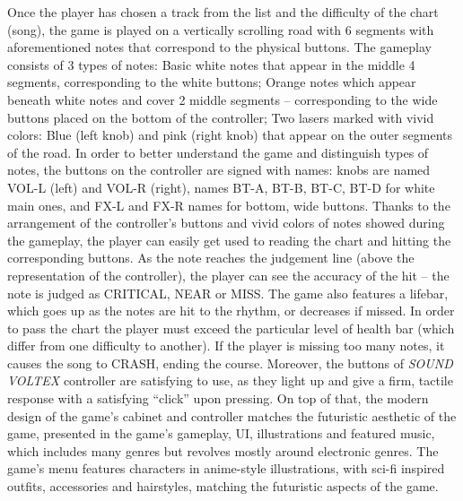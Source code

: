 Once the player has chosen a track from the list and the difficulty of the chart (song), the game is played on a vertically scrolling road with 6 segments with aforementioned notes that correspond to the physical buttons. The gameplay consists of 3 types of notes: Basic white notes that appear in the middle 4 segments, corresponding to the white buttons; Orange notes which appear beneath white notes and cover 2 middle segments -- corresponding to the wide buttons placed on the bottom of the controller; Two lasers marked with vivid colors: Blue (left knob) and pink (right knob) that appear on the outer segments of the road. In order to better understand the game and distinguish types of notes, the buttons on the controller are signed with names: knobs are named VOL-L (left) and VOL-R (right), names BT-A, BT-B, BT-C, BT-D for white main ones, and FX-L and FX-R names for bottom, wide buttons. Thanks to the arrangement of the controller’s buttons and vivid colors of notes showed during the gameplay, the player can easily get used to reading the chart and hitting the corresponding buttons. As the note reaches the judgement line (above the representation of the controller), the player can see the accuracy of the hit -- the note is judged as CRITICAL, NEAR or MISS. The game also features a lifebar, which goes up as the notes are hit to the rhythm, or decreases if missed. In order to pass the chart the player must exceed the particular level of health bar (which differ from one difficulty to another). If the player is missing too many notes, it causes the song to CRASH, ending the course. Moreover, the buttons of \textit{SOUND VOLTEX} controller are satisfying to use, as they light up and give a firm, tactile response with a satisfying “click” upon pressing. On top of that, the modern design of the game’s cabinet and controller matches the futuristic aesthetic of the game, presented in the game’s gameplay, UI, illustrations and featured music, which includes many genres but revolves mostly around electronic genres. The game’s menu features characters in anime-style illustrations, with sci-fi inspired outfits, accessories and hairstyles, matching the futuristic aspects of the game. 

